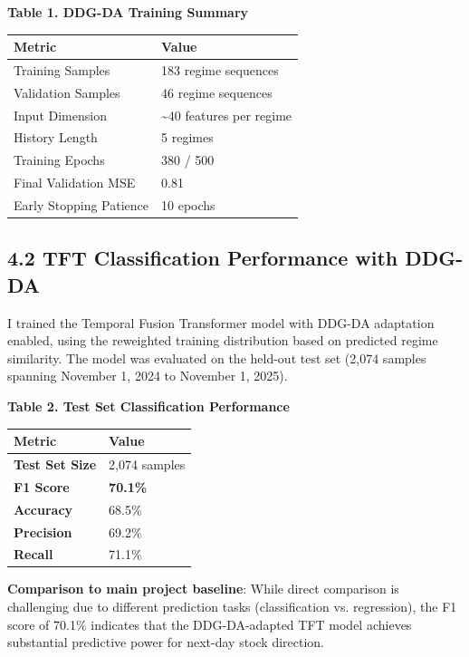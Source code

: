 \documentclass[
]{article}
\newcounter{none} %
\begin{document}
\textbf{Table 1. DDG-DA Training Summary}

{\def\LTcaptype{none} %
\begin{longtable}[]{@{}ll@{}}
\toprule\noalign{}
Metric & Value \\
\midrule\noalign{}
\endhead
\bottomrule\noalign{}
\endlastfoot
Training Samples & 183 regime sequences \\
Validation Samples & 46 regime sequences \\
Input Dimension & \textasciitilde40 features per regime \\
History Length & 5 regimes \\
Training Epochs & 380 / 500 \\
Final Validation MSE & 0.81 \\
Early Stopping Patience & 10 epochs \\
\end{longtable}
}

\subsection{4.2 TFT Classification Performance with
DDG-DA}\label{42-tft-classification-performance-with-ddg-da}

I trained the Temporal Fusion Transformer model with DDG-DA adaptation
enabled, using the reweighted training distribution based on predicted
regime similarity. The model was evaluated on the held-out test set
(2,074 samples spanning November 1, 2024 to November 1, 2025).

\textbf{Table 2. Test Set Classification Performance}

{\def\LTcaptype{none} %
\begin{longtable}[]{@{}ll@{}}
\toprule\noalign{}
Metric & Value \\
\midrule\noalign{}
\endhead
\bottomrule\noalign{}
\endlastfoot
\textbf{Test Set Size} & 2,074 samples \\
\textbf{F1 Score} & \textbf{70.1\%} \\
\textbf{Accuracy} & 68.5\% \\
\textbf{Precision} & 69.2\% \\
\textbf{Recall} & 71.1\% \\
\end{longtable}
}

\textbf{Comparison to main project baseline}: While direct comparison is
challenging due to different prediction tasks (classification vs.
regression), the F1 score of 70.1\% indicates that the DDG-DA-adapted
TFT model achieves substantial predictive power for next-day stock
direction.
\end{document}

